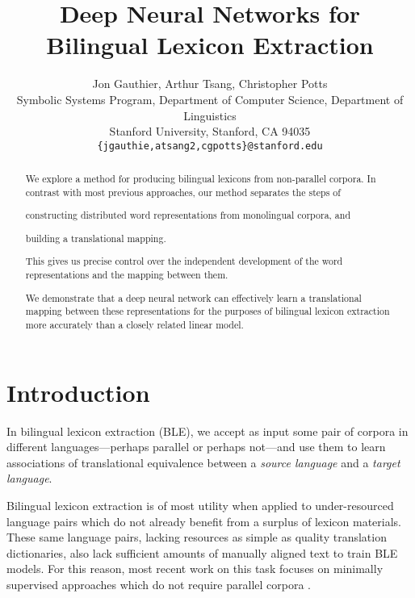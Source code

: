 \documentclass[11pt]{article}
\title{Deep Neural Networks for Bilingual Lexicon Extraction}
\author{Jon Gauthier,\affilA{} Arthur Tsang,\affilB{} Christopher Potts\affilC{} \\
  \affilA{} Symbolic Systems Program, \affilB{}Department of Computer Science, \affilC{}Department of Linguistics \\
Stanford University, Stanford, CA 94035 \\
{\tt \{jgauthie,atsang2,cgpotts\}@stanford.edu}}
\date{}
\begin{document}
\maketitle

\begin{abstract}
  We explore a method for producing bilingual lexicons from non-parallel
  corpora. In contrast with most previous approaches, our method separates the
  steps of \begin{inparaenum}[(1)]
  \item constructing distributed word representations from monolingual corpora,
    and
  \item building a translational mapping.
  \end{inparaenum}

  This gives us precise control over the independent development of the word
  representations and the mapping between them.

  We demonstrate that a deep neural network can effectively learn a
  translational mapping between these representations for the purposes of
  bilingual lexicon extraction more accurately than a closely related linear
  model.
\end{abstract}

\section{Introduction}
\label{sec:introduction}

In bilingual lexicon extraction (BLE), we accept as input some pair of corpora
in different languages---perhaps parallel or perhaps not---and use them to learn
associations of translational equivalence between a \textit{source language} and
a \textit{target language}.

Bilingual lexicon extraction is of most utility when applied to under-resourced
language pairs which do not already benefit from a surplus of lexicon materials.
These same language pairs, lacking resources as simple as quality translation
dictionaries, also lack sufficient amounts of manually aligned text to train BLE
models. For this reason, most recent work on this task focuses on minimally
supervised approaches which do not require parallel corpora
\cite{rapp1995,peirsman2010}.
\end{document}
